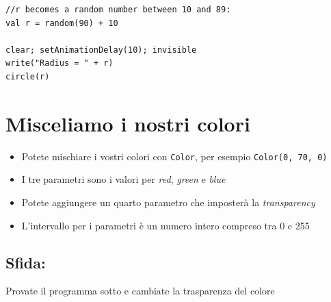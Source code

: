   

\begin{lstlisting}[basicstyle={\ttfamily\fontsize{20}{24}\selectfont},numbers=none]
//r becomes a random number between 10 and 89:
val r = random(90) + 10   

clear; setAnimationDelay(10); invisible
write("Radius = " + r)
circle(r)
\end{lstlisting}
        
\chapter{Misceliamo i nostri colori}

\begin{itemize}

\item {Potete mischiare i vostri colori con \lstinline{Color}, per esempio \lstinline{Color(0, 70, 0)}}
\item {I tre parametri sono i valori per {\it red}, {\it green} e {\it blue}}
\item {Potete aggiungere un quarto parametro che imposterà la {\it transparency}}
\item {L'intervallo per i parametri è un numero intero compreso tra 0 e 255}

\end{itemize}


\section*{\color{BrickRed}Sfida:}
Provate il programma sotto e cambiate la trasparenza del colore

